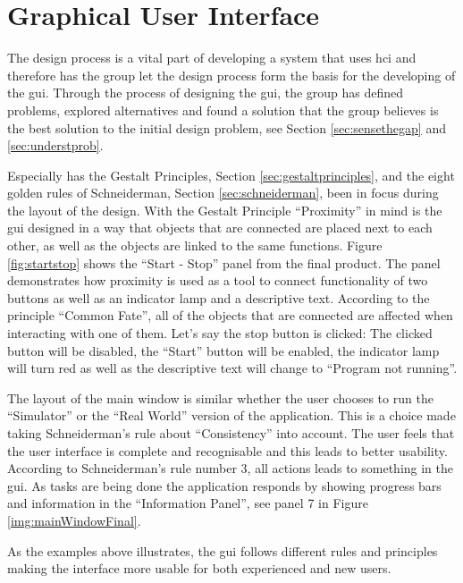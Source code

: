 



\section{Graphical User Interface}
The design process is a vital part of developing a system that uses \acrfull{hci} and therefore has the group let the design process form the basis for the developing of the \acrlong{gui}. Through the process of designing the \acrshort{gui}, the group has defined problems, explored alternatives and found a solution that the group believes is the best solution to the initial design problem, see Section \ref{sec:sensethegap} and \ref{sec:understprob}.

Especially has the Gestalt Principles, Section \ref{sec:gestaltprinciples}, and the eight golden rules of Schneiderman, Section \ref{sec:schneiderman}, been in focus during the layout of the design. With the Gestalt Principle ``Proximity'' in mind is the \acrshort{gui} designed in a way that objects that are connected are placed next to each other, as well as the objects are linked to the same functions. Figure \ref{fig:startstop} shows the ``Start - Stop'' panel from the final product. The panel demonstrates how proximity is used as a tool to connect functionality of two buttons as well as an indicator lamp and a descriptive text. According to the principle ``Common Fate'', all of the objects that are connected are affected when interacting with one of them. Let's say the stop button is clicked: The clicked button will be disabled, the ``Start'' button will be enabled, the indicator lamp will turn red as well as the descriptive text will change to ``Program not running''.


The layout of the main window is similar whether the user chooses to run the ``Simulator'' or the ``Real World'' version of the application. This is a choice made taking Schneiderman's rule about ``Consistency'' into account. The user feels that the user interface is complete and recognisable and this leads to better usability. According to Schneiderman's rule number 3, all actions leads to something in the \acrshort{gui}. As tasks are being done the application responds by showing progress bars and information in the ``Information Panel'', see panel 7 in Figure \ref{img:mainWindowFinal}. 

As the examples above illustrates, the \acrshort{gui} follows different rules and principles making the interface more usable for both experienced and new users.
